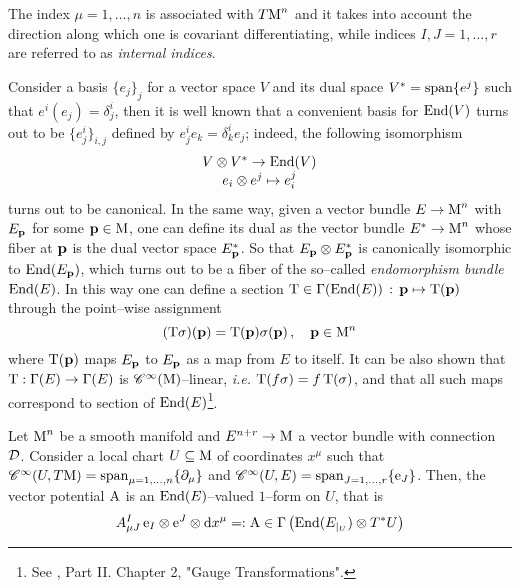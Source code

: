 The index $\mu=1,\hdots,n$ is associated with $T\text{\normalfont M}^n$ and it takes into account the direction along which one is covariant differentiating, while indices $I,J=1,\hdots,r$ are referred to as \emph{internal indices}.

\begin{remark}
    Consider a basis $\{e_j\}_j$ for a vector space $V$ and its dual space $V^{*}=\operatorname{span}\{e^j\}$ such that $e^i(e_j)=\delta^i_j$, then it is well known that a convenient basis for $\text{\normalfont End}(V)$ turns out to be $\{e^i_j\}_{i,j}$ defined by $e^i_je_k=\delta^i_ke_j$; indeed, the following isomorphism
    $$\begin{matrix}
        V\otimes V^{*}\to\text{\normalfont End}(V)\\
        e_i\otimes e^j\mapsto e_i^j
    \end{matrix}$$
    turns out to be canonical. In the same way, given a vector bundle $E\to\text{\normalfont M}^n$ with $E_{\mathbf{p}}$ for some $\mathbf{p}\in\text{\normalfont M}$, one can define its dual as the vector bundle $E^*\to\text{\normalfont M}^n$ whose fiber at $\mathbf{p}$ is the dual vector space $E_{\mathbf{p}}^*$. So that $E_{\mathbf{p}}\otimes E_{\mathbf{p}}^*$ is canonically isomorphic to $\text{\normalfont End}(E_{\mathbf{p}})$, which turns out to be a fiber of the so--called \emph{endomorphism bundle} $\text{\normalfont End}(E)$. In this way one can define a section $\text{\normalfont T}\in\Gamma(\text{\normalfont End}(E))\,:\,\mathbf{p}\mapsto\text{\normalfont T}(\mathbf{p})$\,\, through the point--wise assignment
    $$(\text{\normalfont T}\sigma)(\mathbf{p})=\text{\normalfont T}(\mathbf{p})\sigma(\mathbf{p})\,,\quad \mathbf{p}\in\text{\normalfont M}^n$$
    where $\text{\normalfont T}(\mathbf{p})$ maps $E_{\mathbf{p}}$ to $E_{\mathbf{p}}$ as a map from $E$ to itself. It can be also shown that $\text{\normalfont T}:\Gamma(E)\to\Gamma(E)$ is $\mathscr{C}^\infty(\text{\normalfont M})$--linear, \emph{i.e.} $\text{\normalfont T}(f\sigma)=f\,\text{\normalfont T}(\sigma)$, and that all such maps correspond to section of $\text{\normalfont End}(E)$\footnote{See \cite{baez}, Part II. Chapter 2, "Gauge Transformations".}.

    
    
\end{remark}

\begin{prop}
    Let $\text{\normalfont M}^n$ be a smooth manifold and $E^{n+r}\to\text{\normalfont M}$ a vector bundle with connection $\mathcal{D}$. Consider a local chart $U\subseteq\text{\normalfont M}$ of coordinates $x^\mu$ such that $\mathscr{C}^\infty(U,T\text{\normalfont M})={\operatorname{span}_{\mu=1,\hdots,n}\{\partial_\mu\}}$ and $\mathscr{C}^\infty(U,E)={\operatorname{span}_{J=1,\hdots,r}\{\text{\normalfont e}_J\}}$. Then, the vector potential $\text{\normalfont A}$ is an $\text{\normalfont End}(E)$--valued $1$--form on $U$, that is
    $$ A^I_{\mu J}\,\text{\normalfont e}_I\otimes\text{\normalfont e}^J\otimes\text{\normalfont d} x^\mu=:\text{\normalfont A}\in\Gamma\left(\text{\normalfont End}(E_{|_U})\otimes T^*U\right)$$
\end{prop}

